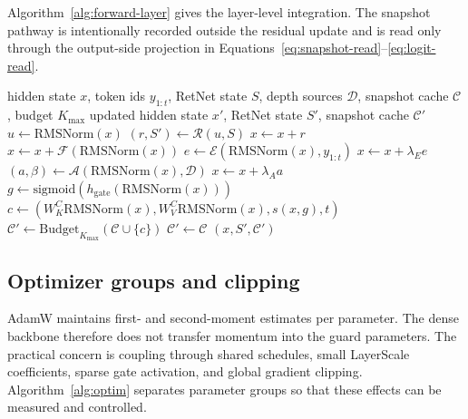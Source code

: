 \documentclass[11pt]{article}
\newcommand{\Ret}{\mathcal{R}}
\newcommand{\Eng}{\mathcal{E}}
\newcommand{\Att}{\mathcal{A}}
\newcommand{\FFN}{\mathcal{F}}
\newcommand{\Cache}{\mathcal{C}}
\newcommand{\RMS}{\mathrm{RMSNorm}}
\newcommand{\sigmoid}{\mathrm{sigmoid}}
\begin{document}
Algorithm~\ref{alg:forward-layer} gives the layer-level integration. The snapshot pathway is intentionally recorded outside the residual update and is read only through the output-side projection in Equations~\eqref{eq:snapshot-read}--\eqref{eq:logit-read}.

\begin{algorithm}[H]
\caption{Forward pass of a budgeted hybrid layer}
\label{alg:forward-layer}
\begin{algorithmic}[1]
\Require hidden state $x$, token ids $y_{1:t}$, RetNet state $S$, depth sources $\mathcal{D}$, snapshot cache $\Cache$, budget $K_{\max}$
\Ensure updated hidden state $x'$, RetNet state $S'$, snapshot cache $\Cache'$
\State $u \gets \RMS(x)$
\State $(r,S') \gets \Ret(u,S)$ 
\State $x \gets x+r$
\State $x \gets x+\FFN(\RMS(x))$ 
    \State $e \gets \Eng(\RMS(x),y_{1:t})$
    \State $x \gets x+\lambda_E e$ 
\EndIf
{}
    \State $(a,\beta) \gets \Att(\RMS(x),\mathcal{D})$
    \State $x \gets x+\lambda_A a$ 
\EndIf
\State $g \gets \sigmoid(h_{\mathrm{gate}}(\RMS(x)))$
    \State $c \gets (W_K^C\RMS(x), W_V^C\RMS(x), s(x,g), t)$
    \State $\Cache' \gets \mathrm{Budget}_{K_{\max}}(\Cache\cup\{c\})$
\Else
    \State $\Cache' \gets \Cache$
\EndIf
\State \Return $(x,S',\Cache')$
\end{algorithmic}
\end{algorithm}

\subsection{Optimizer groups and clipping}

AdamW maintains first- and second-moment estimates per parameter. The dense backbone therefore does not transfer momentum into the guard parameters. The practical concern is coupling through shared schedules, small LayerScale coefficients, sparse gate activation, and global gradient clipping. Algorithm~\ref{alg:optim} separates parameter groups so that these effects can be measured and controlled.
\end{document}
